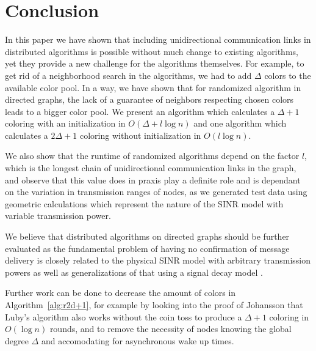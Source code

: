 
\chapter{Conclusion}
\label{ch:conclusion}

In this paper we have shown that including unidirectional communication links in distributed algorithms is possible without much change to existing algorithms, yet they provide a new challenge for the algorithms themselves. For example, to get rid of a neighborhood search in the algorithms, we had to add $\Delta$ colors to the available color pool. In a way, we have shown that for randomized algorithm in directed graphs, the lack of a guarantee of neighbors respecting chosen colors leads to a bigger color pool. We present an algorithm which calculates a $\Delta+1$ coloring with an initialization in $O(\Delta+l\log n)$ and one algorithm which calculates a $2\Delta+1$ coloring without initialization in $O(l\log n)$.

We also show that the runtime of randomized algorithms depend on the factor $l$, which is the longest chain of unidirectional communication links in the graph, and observe that this value does in praxis play a definite role and is dependant on the variation in transmission ranges of nodes, as we generated test data using geometric calculations which represent the nature of the SINR model with variable transmission power.

We believe that distributed algorithms on directed graphs should be further evaluated as the fundamental problem of having no confirmation of message delivery is closely related to the physical SINR model with arbitrary transmission powers as well as generalizations of that using a signal decay model \cite{DBLP:journals/corr/BodlaenderH14}.

Further work can be done to decrease the amount of colors in Algorithm~\ref{alg:r2d+1}, for example by looking into the proof of Johansson \cite{johansson1999simple} that Luby's algorithm also works without the coin toss to produce a $\Delta+1$ coloring in $O(\log n)$ rounds, and to remove the necessity of nodes knowing the global degree $\Delta$ and accomodating for asynchronous wake up times.